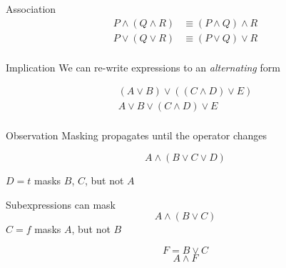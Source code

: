 \documentclass[xcolor = {dvipsnames, table}]{beamer}
\begin{document}
\begin{frame}
    \begin{block}{Association}
        \begin{align*}
            P \wedge (Q \wedge R) & \equiv (P \wedge Q) \wedge R \\
            P \vee (Q \vee R) & \equiv (P \vee Q) \vee R \\
        \end{align*}
    \end{block}

    \begin{block}{Implication}
        We can re-write expressions to an \emph{alternating} form

        \begin{align*}
            (A \vee B) \vee ((C \wedge D) \vee E) \\
            A \vee B \vee (C \wedge D) \vee E     \\
        \end{align*}
    \end{block}
\end{frame}

\begin{frame}
    \begin{block}{Observation}
        Masking propagates until the operator changes
    \end{block}

    \begin{block}{}
        \begin{equation*}
            A \wedge (B \vee C \vee D)
        \end{equation*}

        $D = t$ masks $B$, $C$, but not $A$
    \end{block}
\end{frame}

\begin{frame}
    \begin{block}{Subexpressions can mask}
        \begin{equation*}
            A \wedge (B \vee C)
        \end{equation*}
        $C = f$ masks $A$, but not $B$

        \begin{equation*}
            F = B \vee C
        \end{equation*}
        \begin{equation*}
            A \wedge F
        \end{equation*}
    \end{block}
\end{frame}
\end{document}
